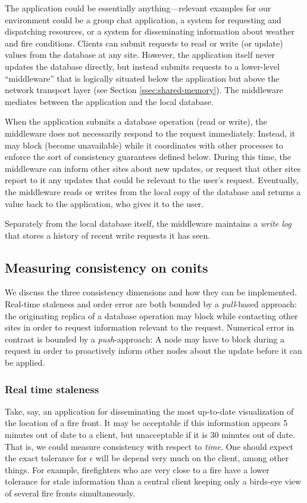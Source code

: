\documentclass[]             %
{NASA}                       %
\theoremstyle{definition}
\begin{document}
The application could be essentially anything---relevant examples for
our environment could be a group chat application, a system for
requesting and dispatching resources, or a system for disseminating
information about weather and fire conditions. Clients can submit
requests to read or write (or update) values from the database at any
site. However, the application itself never updates the database
directly, but instead submits requests to a lower-level ``middleware''
that is logically situated below the application but above the network
transport layer (see Section \ref{ssec:shared-memory}). The middleware
mediates between the application and the local database.

When the application submits a database operation (read or write), the
middleware does not necessarily respond to the request
immediately. Instead, it may block (become unavailable) while it
coordinates with other processes to enforce the sort of consistency
guarantees defined below. During this time, the middleware can inform
other sites about new updates, or request that other sites report to
it any updates that could be relevant to the user's
request. Eventually, the middleware reads or writes from the local
copy of the database and returns a value back to the application, who
gives it to the user.

Separately from the local database itself, the middleware maintains a
\emph{write log} that stores a history of recent write requests it has
seen.

\subsection{Measuring consistency on conits}
\label{measuring-consistency-on-conits}

We discuss the three consistency dimensions and how they can be
implemented. Real-time staleness and order error are both bounded by a
\emph{pull}-based approach: the originating replica of a database
operation may block while contacting other sites in order to request
information relevant to the request. Numerical error in contrast is
bounded by a \emph{push}-approach: A node may have to block during a
request in order to proactively inform other nodes about the update
before it can be applied.

\subsubsection{Real time staleness}
\label{sssec:real-time-consistency}
Take, say, an application for disseminating the most up-to-date
visualization of the location of a fire front. It may be acceptable if
this information appears 5 minutes out of date to a client, but
unacceptable if it is 30 minutes out of date. That is, we could
measure consistency with respect to \emph{time}. One should expect the
exact tolerance for \(\epsilon\) will be depend very much on the
client, among other things. For example, firefighters who are very
close to a fire have a lower tolerance for stale information than a
central client keeping only a birds-eye view of several fire fronts
simultaneously.
\end{document}
